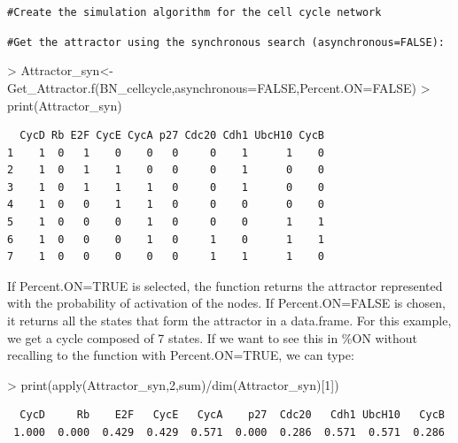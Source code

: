 \documentclass[a4paper]{article}
\begin{document}
\texttt{\#Create the simulation algorithm for the cell cycle network}
\begin{Schunk}
\end{Schunk}
\texttt{\#Get the attractor using the synchronous search (asynchronous=FALSE):}
\begin{Schunk}
\begin{Sinput}
> Attractor_syn<-Get_Attractor.f(BN_cellcycle,asynchronous=FALSE,Percent.ON=FALSE)
> print(Attractor_syn)
\end{Sinput}
\end{Schunk}
\begin{verbatim}
  CycD Rb E2F CycE CycA p27 Cdc20 Cdh1 UbcH10 CycB
1    1  0   1    0    0   0     0    1      1    0
2    1  0   1    1    0   0     0    1      0    0
3    1  0   1    1    1   0     0    1      0    0
4    1  0   0    1    1   0     0    0      0    0
5    1  0   0    0    1   0     0    0      1    1
6    1  0   0    0    1   0     1    0      1    1
7    1  0   0    0    0   0     1    1      1    0
\end{verbatim}
If Percent.ON=TRUE is selected, the function returns the attractor represented with the probability of activation of the nodes. If Percent.ON=FALSE is chosen, it returns all the states that form the attractor in a data.frame. For this example, we get a cycle composed of 7 states. If we want to see this in \%ON without recalling to the function with Percent.ON=TRUE, we can type:
\begin{Schunk}
\begin{Sinput}
> print(apply(Attractor_syn,2,sum)/dim(Attractor_syn)[1])
\end{Sinput}
\end{Schunk}

\begin{verbatim}
  CycD     Rb    E2F   CycE   CycA    p27  Cdc20   Cdh1 UbcH10   CycB 
 1.000  0.000  0.429  0.429  0.571  0.000  0.286  0.571  0.571  0.286 
\end{verbatim}
\end{document}
